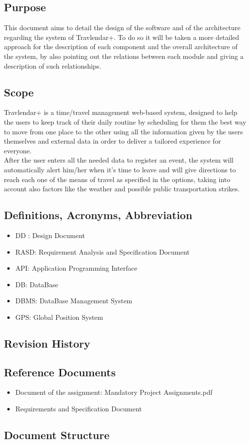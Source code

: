 \subsection{Purpose}
This document aims to detail the design of the software and of the architecture regarding the system of Travlendar+.
To do so it will be taken a more detailed approach for the description of each component and the overall architecture of the system, by also pointing out the relations between each module and giving a description of such relationships.

\subsection{Scope}
Travlendar+ is a time/travel management web-based system, designed to help the users to keep track of their daily routine by scheduling for them the best way to move from one place to the other using all the information given by the users themselves and external data in order to deliver a tailored experience for everyone.\\
After the user enters all the needed data to register an event, the system will automatically alert him/her when it’s time to leave and will give directions to reach each one of the means of travel as specified in the options, taking into account also factors like the weather and possible public transportation strikes.

\subsection{Definitions, Acronyms, Abbreviation}
\begin{itemize}
\item DD : Design Document
\item RASD: Requirement Analysis and Specification Document
\item API: Application Programming Interface
\item DB: DataBase
\item DBMS: DataBase Management System
\item GPS: Global Position System
\end{itemize}

\subsection{Revision History}

\subsection{Reference Documents}
\begin{itemize}
\item Document of the assignment: Mandatory Project Assignments.pdf
\item Requirements and Specification Document
\end{itemize}

\subsection{Document Structure}


